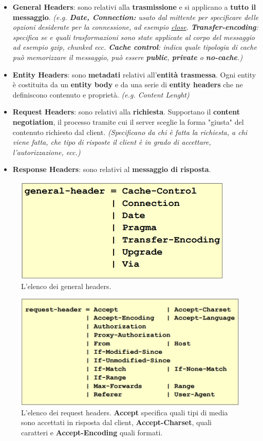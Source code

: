 \documentclass[11pt,a4paper]{article}
\theoremstyle{definition}
\begin{document}
\begin{itemize}
	\item \textbf{General Headers}: sono relativi alla \textbf{trasmissione} e si applicano a \textbf{tutto il messaggio}. \textit{(e.g. \textbf{Date, Connection:} usato dal mittente per specificare delle opzioni desiderate per la connessione, ad esempio \underline{close}. \textbf{Transfer-encoding}: specifica se e quali trasformazioni sono state applicate al corpo del messaggio ad esempio gzip, chunked ecc. \textbf{Cache control}: indica quale tipologia di cache può memorizzare il messaggio, può essere \textbf{public}, \textbf{private} o \textbf{no-cache}.)}
	\item \textbf{Entity Headers}: sono \textbf{metadati} relativi all'\textbf{entità trasmessa}. Ogni entity è costituita da un \textbf{entity body} e da una
	      serie di \textbf{entity headers} che ne definiscono contenuto e
	      proprietà. \textit{(e.g. Content Lenght)}
	\item \textbf{Request Headers}: sono relativi alla \textbf{richiesta}. Supportano il \textbf{content negotiation}, il processo tramite cui il server sceglie la forma "giusta" del contenuto richiesto dal client. \textit{(Specificano da chi è fatta la richiesta, a chi viene fatta, che tipo di risposte il client è in grado di accettare, l'autorizzazione, ecc.)}
	\item \textbf{Response Headers}: sono relativi al \textbf{messaggio di risposta}.
\end{itemize}
\newpage
\begin{figure}[!h]
	\includegraphics[scale=0.3]{Immagini/General_h.png}
	\centering
	\caption{L'elenco dei general headers.}
\end{figure}
\begin{figure}[!h]
	\includegraphics[scale=0.3]{Immagini/Req_h.png}
	\centering
	\caption{L'elenco dei request headers. \textbf{Accept} specifica quali tipi di media sono accettati in risposta dal client, \textbf{Accept-Charset}, quali caratteri e \textbf{Accept-Encoding} quali formati.}
\end{figure}
\end{document}
